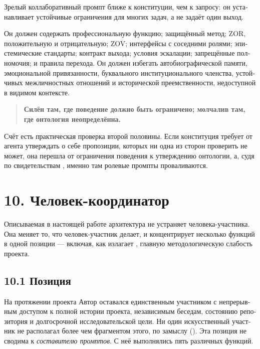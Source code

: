\begin{russian}
Зрелый коллаборативный промпт ближе к конституции, чем к запросу: он устанавливает устойчивые ограничения для многих задач, а не задаёт один выход.

Он должен содержать профессиональную функцию; защищённый метод; ZOR, положительную и отрицательную; ZOV; интерфейсы с соседними ролями; эпистемические стандарты; контракт выхода; условия эскалации; запрещённые полномочия; и правила перехода. Он должен избегать автобиографической памяти, эмоциональной привязанности, буквального институционального членства, устойчивых межличностных отношений и исторической преемственности, недоступной в видимом контексте.

\begin{quote}
\textbf{Силён там, где поведение должно быть ограничено; молчалив там, где онтология неопределённа.}
\end{quote}
Счёт  есть практическая проверка второй половины. Если конституция требует от агента утверждать о себе пропозиции, которых ни одна из сторон проверить не может, она перешла от ограничения поведения к утверждению онтологии, а, судя по свидетельствам , именно там ролевые промпты проваливаются.


\section*{10. Человек-координатор}
\label{sec:ru:10}

Описываемая в настоящей работе архитектура не устраняет человека-участника. Она меняет то, что человек-участник делает, и концентрирует несколько функций в одной позиции — включая, как излагает , главную методологическую слабость проекта.


\subsection*{10.1 Позиция}
\label{sec:ru:10.1}

На протяжении проекта Автор оставался единственным участником с непрерывным доступом к полной истории проекта, независимым беседам, состоянию репозитория и долгосрочной исследовательской цели. Ни один искусственный участник не располагал более чем фрагментом этого, по замыслу (). Эта позиция не сводима к \emph{составителю промптов}. С неё выполнялись пять различных функций.



\end{russian}
